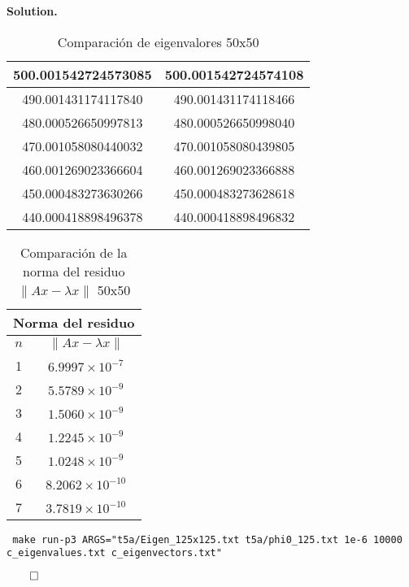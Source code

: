 \documentclass{article}
\theoremstyle{problemstyle}
\newenvironment{solution}{%
  \begin{mdframed}[linewidth=0.8pt,linecolor=Gray,backgroundcolor=Gray!5,roundcorner=5pt]%
  \noindent\textbf{Solution.}%
}{%
\hfill $ \qed $ 
  \end{mdframed}%
}
\begin{document}
\begin{solution}
\begin{table}[H]
\begin{center}
\begin{tabular}{|c|c|}
				500.001542724573085 & 500.001542724574108 \\
				\hline
				490.001431174117840 & 490.001431174118466 \\
				\hline
				480.000526650997813 & 480.000526650998040 \\
				\hline
				470.001058080440032 & 470.001058080439805 \\
				\hline
				460.001269023366604 & 460.001269023366888 \\
				\hline
				450.000483273630266 & 450.000483273628618 \\
				\hline
				440.000418898496378 & 440.000418898496832 \\
				\hline
			\end{tabular}
		\end{center}
		\caption{Comparaci\'on de eigenvalores 50x50}\label{tab:evals_comparison_large2}
	\end{table}

	\begin{table}[H]
		\begin{center}
			\begin{tabular}{|c|c|}
				\multicolumn{2}{c}{Norma del residuo} \\
				\hline
				$n$ & $\lVert Ax - \lambda x \rVert$  \\
				\hline
				1   & $6.9997 \times 10^{-7}$         \\
				\hline
				2   & $5.5789 \times 10^{-9}$         \\
				\hline
				3   & $1.5060 \times 10^{-9}$         \\
				\hline
				4   & $1.2245 \times 10^{-9}$         \\
				\hline
				5   & $1.0248 \times 10^{-9}$         \\
				\hline
				6   & $8.2062 \times 10^{-10}$        \\
				\hline
				7   & $3.7819 \times 10^{-10}$        \\
				\hline
			\end{tabular}
		\end{center}
		\caption{Comparaci\'on de la norma del residuo $\lVert Ax - \lambda x \rVert$ 50x50}\label{tab:residual_norms_tiny}
	\end{table}
	\begin{center}
		\texttt{
			make run-p3 ARGS="t5a/Eigen\_125x125.txt t5a/phi0\_125.txt 1e-6
			10000 c\_eigenvalues.txt c\_eigenvectors.txt"
		}

	\end{center}


\end{solution}
\end{document}
